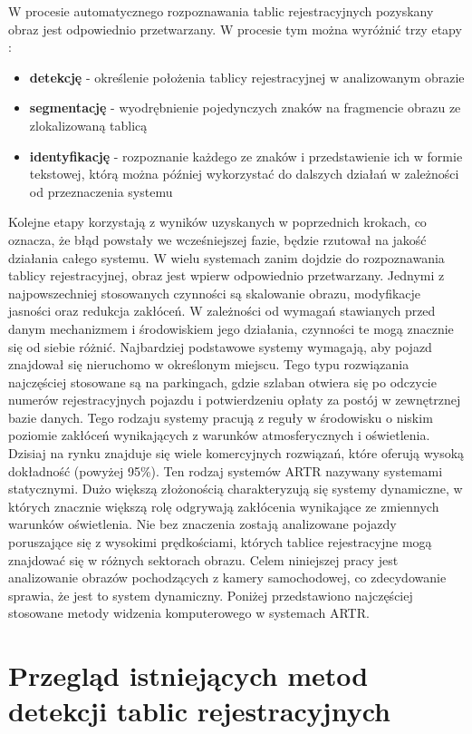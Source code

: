 W procesie automatycznego rozpoznawania tablic rejestracyjnych pozyskany obraz jest odpowiednio przetwarzany.
W procesie tym można wyróżnić trzy etapy \cite{1688109}:
\begin{itemize}
    \item \textbf{detekcję} - określenie położenia tablicy rejestracyjnej w analizowanym obrazie
    \item \textbf{segmentację} - wyodrębnienie pojedynczych znaków na fragmencie obrazu ze zlokalizowaną tablicą
    \item \textbf{identyfikację} - rozpoznanie każdego ze znaków i przedstawienie ich w formie tekstowej, którą można później wykorzystać do dalszych działań w zależności od przeznaczenia systemu
\end{itemize}
Kolejne etapy korzystają z wyników uzyskanych w poprzednich krokach, co oznacza, że błąd powstały we wcześniejszej fazie, będzie rzutował na jakość działania całego systemu.
W wielu systemach zanim dojdzie do rozpoznawania tablicy rejestracyjnej, obraz jest wpierw odpowiednio przetwarzany.
Jednymi z najpowszechniej stosowanych czynności są skalowanie obrazu, modyfikacje jasności oraz redukcja zakłóceń.
W zależności od wymagań stawianych przed danym mechanizmem i środowiskiem jego działania, czynności te mogą znacznie się od siebie różnić.
Najbardziej podstawowe systemy wymagają, aby pojazd znajdował się nieruchomo w określonym miejscu.
Tego typu rozwiązania najczęściej stosowane są na parkingach, gdzie szlaban otwiera się po odczycie numerów rejestracyjnych pojazdu i potwierdzeniu opłaty za postój w zewnętrznej bazie danych.
Tego rodzaju systemy pracują z reguły w środowisku o niskim poziomie zakłóceń wynikających z warunków atmosferycznych i oświetlenia.
Dzisiaj na rynku znajduje się wiele komercyjnych rozwiązań, które oferują wysoką dokładność (powyżej 95\%).
Ten rodzaj systemów ARTR nazywany systemami statycznymi.
Dużo większą złożonością charakteryzują się systemy dynamiczne, w których znacznie większą rolę odgrywają zakłócenia wynikające ze zmiennych warunków oświetlenia.
Nie bez znaczenia zostają analizowane pojazdy poruszające się z wysokimi prędkościami, których tablice rejestracyjne mogą znajdować się w różnych sektorach obrazu.
Celem niniejszej pracy jest analizowanie obrazów pochodzących z kamery samochodowej, co zdecydowanie sprawia, że jest to system dynamiczny.
Poniżej przedstawiono najczęściej stosowane metody widzenia komputerowego w systemach ARTR.


\section{Przegląd istniejących metod detekcji tablic rejestracyjnych}


